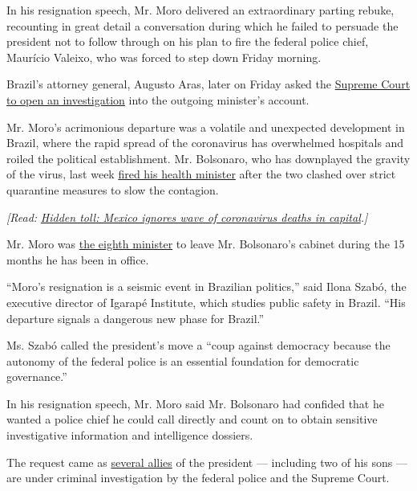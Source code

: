 In his resignation speech, Mr. Moro delivered an extraordinary parting
rebuke, recounting in great detail a conversation during which he failed
to persuade the president not to follow through on his plan to fire the
federal police chief, Maurício Valeixo, who was forced to step down
Friday morning.

Brazil's attorney general, Augusto Aras, later on Friday asked the
\href{https://slack-redir.net/link?url=http\%3A\%2F\%2Fwww.mpf.mp.br\%2Fpgr\%2Fnoticias-pgr\%2Faugusto-aras-solicita-inquerito-ao-stf-para-apurar-fatos-narrados-e-declaracoes-de-sergio-moro\%2F}{Supreme
Court to open an investigation} into the outgoing minister's account.

Mr. Moro's acrimonious departure was a volatile and unexpected
development in Brazil, where the rapid spread of the coronavirus has
overwhelmed hospitals and roiled the political establishment. Mr.
Bolsonaro, who has downplayed the gravity of the virus, last week
\href{https://www.nytimes3xbfgragh.onion/aponline/2020/04/16/world/americas/ap-lt-virus-outbreak-brazil-health-minister.html}{fired
his health minister} after the two clashed over strict quarantine
measures to slow the contagion.

\emph{{[}Read:}
\href{http://www.nytimes3xbfgragh.onion/2020/05/08/world/americas/mexico-coronavirus-count.html}{\emph{Hidden
toll: Mexico ignores wave of coronavirus deaths in capital}}\emph{.{]}}

Mr. Moro was
\href{https://g1.globo.com/politica/noticia/2020/04/24/veja-os-ministros-que-sairam-do-governo-bolsonaro.ghtml?utm_source=push\&utm_medium=app\&utm_campaign=pushg1}{the
eighth minister} to leave Mr. Bolsonaro's cabinet during the 15 months
he has been in office.

``Moro's resignation is a seismic event in Brazilian politics,'' said
Ilona Szabó, the executive director of Igarapé Institute, which studies
public safety in Brazil. ``His departure signals a dangerous new phase
for Brazil.''

Ms. Szabó called the president's move a ``coup against democracy because
the autonomy of the federal police is an essential foundation for
democratic governance.''

In his resignation speech, Mr. Moro said Mr. Bolsonaro had confided that
he wanted a police chief he could call directly and count on to obtain
sensitive investigative information and intelligence dossiers.

The request came as
\href{https://www.nytimes3xbfgragh.onion/2019/01/24/world/americas/jair-bolsonaro-davos.html}{several
allies} of the president --- including two of his sons --- are under
criminal investigation by the federal police and the Supreme Court.

